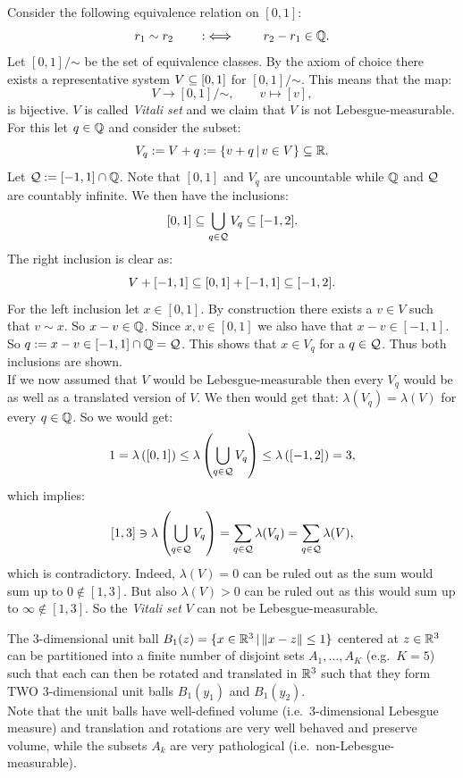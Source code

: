 \begin{Eg}
    Consider the following equivalence relation on $[0,1]$:
    \[ r_1 \sim r_2 \qquad :\iff \qquad r_2-r_1 \in \mathbb{Q}.\]
    Let $[0,1]/\mathord{\sim}$ be the set of equivalence classes.
    By the axiom of choice there exists a representative system $V \subseteq [0,1]$ for $[0,1]/\mathord{\sim}$.
    This means that the map:
    \[ V \to [0,1]/\mathord{\sim}, \qquad v \mapsto [v],\]
    is bijective. $V$ is called \emph{Vitali set} and we claim that $V$ is not Lebesgue-measurable.\\
    For this let $q \in \mathbb{Q}$ and consider the subset:
    \[V_q :=  V+q := \left \{ v + q \,|\, v \in V \right \}  \subseteq \mathbb{R}. \]
    Let $\mathcal{Q} := [-1,1] \cap \mathbb{Q}$.  Note that $[0,1]$ and $V_q$ are uncountable while $\mathbb{Q}$ and $\mathcal{Q}$ are countably infinite. 
    We then have the inclusions:
    \[ [0,1] \subseteq  \bigcup_{ q \in \mathcal{Q}} V_q \subseteq [-1,2].\]
    The right inclusion is clear as:
     \[V + [-1,1] \subseteq [0,1]+[-1,1] \subseteq [-1,2].\]
    For the left inclusion let $ x\in [0,1]$. By construction there exists a $v \in V$ such that $v \sim x$. 
    So $x - v \in \mathbb{Q}$. Since $x,v \in [0,1]$ we also have that $x-v \in [-1,1]$. So $q := x-v \in [-1,1] \cap \mathbb{Q} =\mathcal{Q}$.
    This shows that $ x \in V_q$ for a $q \in \mathcal{Q}$. Thus both inclusions are shown.\\
    If we now assumed that $V$ would be Lebesgue-measurable then every $V_q$ would be as well as a translated version of $V$.
    We then would get that: $\lambda(V_q) = \lambda(V)$ for every $q\in \mathbb{Q}$. So we would get:
    \[ 1 = \lambda \left ([0,1]\right ) \le \lambda\left (\bigcup_{ q \in \mathcal{Q}} V_q \right )   \le \lambda \left ([-1,2]\right ) =3  ,\]
    which implies:
    \[ [1,3] \ni \lambda\left (\bigcup_{ q \in \mathcal{Q}} V_q \right ) = \sum_{ q\in \mathcal{Q}} \lambda(V_q) = 
    \sum_{ q\in \mathcal{Q}} \lambda(V), \]
    which is contradictory. Indeed, $\lambda(V) =0$ can be ruled out as the sum would sum up to $0 \notin [1,3]$.
    But also $\lambda(V)>0$ can be ruled out as this would sum up to $\infty \notin [1,3]$.
    So the \emph{Vitali set} $V$ can not be Lebesgue-measurable.
\end{Eg}




\begin{Thm}
    \label{thm-banach-tarski}
    The 3-dimensional unit ball $B_1(z)=\{ x \in \mathbb{R}^3\,|\, \|x-z\| \le 1\}$ centered at $z \in \mathbb{R}^3$ can be partitioned into a finite number of disjoint sets $A_1,\dots,A_K$ (e.g.\ $K=5$) such that each can then be rotated and translated in $\mathbb{R}^3$ such that they form TWO 3-dimensional unit balls $B_1(y_1)$ and $B_1(y_2)$.\\
    Note that the unit balls have well-defined volume (i.e.\ 3-dimensional Lebesgue measure) and translation and rotations are very well behaved and preserve volume, while the subsets $A_k$ are very pathological (i.e.\ non-Lebesgue-measurable).
\end{Thm}


